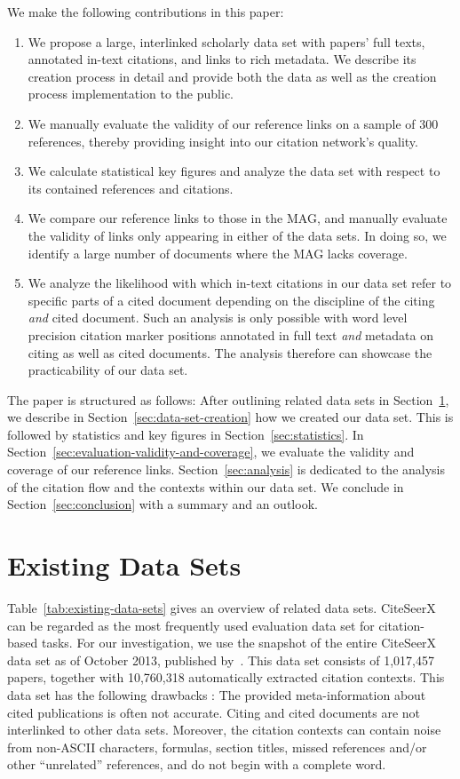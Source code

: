 We make the following contributions in this paper:
\begin{enumerate}
    \item We propose a large, interlinked scholarly data set with papers' full texts, annotated in-text citations, and links to rich metadata. We describe its creation process in detail and provide both the data as well as the creation process implementation to the public. 
    \item We manually evaluate the validity of our reference links on a sample of 300 references, thereby providing insight into our citation network's quality.
    \item We calculate statistical key figures and analyze the data set with respect to its contained references and citations.
    \item We compare our reference links to those in the MAG, and manually evaluate the validity of links only appearing in either of the data sets. In doing so, we identify a large number of documents where the MAG lacks coverage.
    \item We analyze the likelihood with which in-text citations in our data set refer to specific parts of a cited document depending on the discipline of the citing \emph{and} cited document. Such an analysis is only possible with word level precision citation marker positions annotated in full text \emph{and} metadata on citing as well as cited documents. The analysis therefore can showcase the practicability of our data set.
\end{enumerate}

The paper is structured as follows: After outlining related data sets in Section~\ref{sec:related-work}, we describe in Section~\ref{sec:data-set-creation} how we created our data set. This is followed by statistics and key figures in Section~\ref{sec:statistics}. In Section~\ref{sec:evaluation-validity-and-coverage}, we evaluate the validity and coverage of our reference links. Section~\ref{sec:analysis} is dedicated to the analysis of the citation flow and the contexts within our data set. We conclude in Section~\ref{sec:conclusion} with a summary and an outlook.

\section{Existing Data Sets}
\label{sec:related-work}

Table~\ref{tab:existing-data-sets} gives an overview of related data sets.
CiteSeerX can be regarded as the most frequently used evaluation data set for citation-based tasks.
For our investigation, we use the snapshot of the entire CiteSeerX data set as of October 2013, published by~\cite{Huang2015fixed}. This data set consists of 1,017,457 papers, together with 10,760,318 automatically extracted citation contexts.
This data set has the following drawbacks \cite{Roy2016fixed,Faerber2018LREC}: The provided meta-information about cited publications is often not accurate. Citing and cited documents are not interlinked to other data sets. Moreover, the citation contexts can contain noise from non-ASCII characters, formulas, section titles, missed references and/or other ``unrelated'' references, and do not begin with a complete word.

